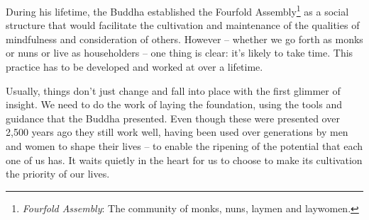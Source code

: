 During his lifetime, the Buddha established the Fourfold Assembly\footnote{\textit{Fourfold Assembly}: The community of monks, nuns, laymen and laywomen.} as a social structure that would facilitate the cultivation and maintenance of the qualities of mindfulness and consideration of others. However -- whether we go forth as monks or nuns or live as householders -- one thing is clear: it's likely to take time. This practice has to be developed and worked at over a lifetime.

Usually, things don't just change and fall into place with the first glimmer of insight. We need to do the work of laying the foundation, using the tools and guidance that the Buddha presented. Even though these were presented over 2,500 years ago they still work well, having been used over generations by men and women to shape their lives -- to enable the ripening of the potential that each one of us has. It waits quietly in the heart for us to choose to make its cultivation the priority of our lives.
